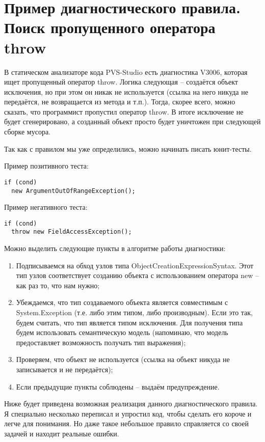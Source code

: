 \documentclass{article}
\begin{document}
\section{Пример диагностического правила. Поиск пропущенного оператора throw}
В статическом анализаторе кода PVS-Studio есть диагностика V3006, которая ищет пропущенный оператор throw. Логика следующая – создаётся объект исключения, но при этом он никак не используется (ссылка на него никуда не передаётся, не возвращается из метода и т.п.). Тогда, скорее всего, можно сказать, что программист пропустил оператор throw. В итоге исключение не будет сгенерировано, а созданный объект просто будет уничтожен при следующей сборке мусора.

Так как с правилом мы уже определились, можно начинать писать юнит-тесты.

Пример позитивного теста:
\begin{lstlisting}
if (cond)
  new ArgumentOutOfRangeException();
\end{lstlisting}
Пример негативного теста:
\begin{lstlisting}
if (cond)
  throw new FieldAccessException();
\end{lstlisting}
Можно выделить следующие пункты в алгоритме работы диагностики:
\begin{enumerate}
\item Подписываемся на обход узлов типа ObjectCreationExpressionSyntax. Этот тип узлов соответствует созданию объекта с использованием оператора new – как раз то, что нам нужно;
\item Убеждаемся, что тип создаваемого объекта является совместимым с System.Exception (т.е. либо этим типом, либо производным). Если это так, будем считать, что тип является типом исключения. Для получения типа будем использовать семантическую модель (напоминаю, что модель предоставляет возможность получать тип выражения);
\item Проверяем, что объект не используется (ссылка на объект никуда не записывается и не передаётся);
\item Если предыдущие пункты соблюдены – выдаём предупреждение.
\end{enumerate}


Ниже будет приведена возможная реализация данного диагностического правила. Я специально несколько переписал и упростил код, чтобы сделать его короче и легче для понимания. Но даже такое небольшое правило справляется со своей задачей и находит реальные ошибки.
\end{document}
